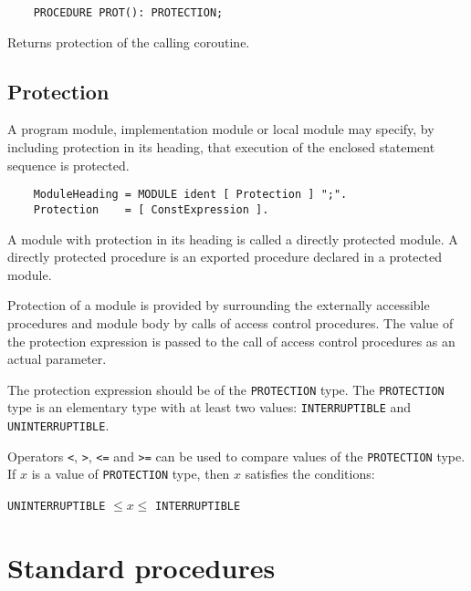 \verb'    PROCEDURE PROT(): PROTECTION;'

Returns protection of the calling coroutine.

\subsection{Protection}\label{m2:ISO:prot}

A program module, implementation module or local module may
specify, by including protection in its heading, that
execution of the enclosed statement sequence is protected.

\begin{verbatim}
    ModuleHeading = MODULE ident [ Protection ] ";".
    Protection    = [ ConstExpression ].
\end{verbatim}

A module with protection in its heading is called a directly
protected module. A directly protected procedure is an exported
procedure declared in a protected module.

Protection of a module is provided by surrounding the externally
accessible procedures and module body by calls of access control
procedures. The value of the protection expression is passed to the
call of access control procedures as an actual parameter.

The protection expression should be of the \verb'PROTECTION' type. The
\verb'PROTECTION' type is an elementary type with at least two values:
{\tt INTERRUPTIBLE} and {\tt UNINTERRUPTIBLE}.

Operators \verb+<+, \verb+>+, \verb+<=+ and \verb+>=+ can be used
to compare values of the \verb'PROTECTION' type.
If $x$ is a value of \verb'PROTECTION' type, then $x$ satisfies the conditions:
\begin{center}
        {\tt UNINTERRUPTIBLE} $\leq x\leq$ {\tt INTERRUPTIBLE}
\end{center}

\section{Standard procedures}\label{m2:stdproc}

